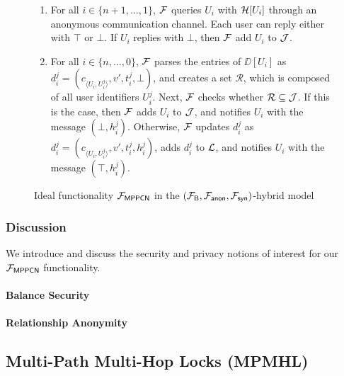 \begin{figure*}[!t]
{{\begin{enumerate}
	\item For all $i \in \{n+1,\ldots,1\}$, $\mathcal{F}$ queries $U_i$ with $\mathcal{H}[U_i]$ through an 
	anonymous communication channel. Each user can reply either with $\top$ or $\bot$. If 
	$U_i$ replies with $\bot$, then $\mathcal{F}$ add $U_i$ to $\mathcal{J}$.
	
	\item For all $i \in \{n,\ldots,0\}$, $\mathcal{F}$ parses the entries of $\DD[U_i]$ as 
	$d_i^j = (c_{\langle U_i,U_i^j \rangle}, v', t_i^j, \bot)$, and creates a set 
	$\mathcal{R}$, which is composed of all user identifiers $U_i^j$. Next, $\mathcal{F}$ checks 
	whether $\mathcal{R} \subseteq \mathcal{J}$. If this is the case, then $\mathcal{F}$ adds $U_i$ to $\mathcal{J}$, 
	and notifies $U_i$ with the message $(\bot, h_i^j)$. Otherwise, $\mathcal{F}$ updates $d_i^j$ as 
	$d_i^j = (c_{\langle U_i,U_i^j \rangle}, v', t_i^j, h_i^j)$, adds $d_i^j$ to $\mathcal{L}$, and 
	notifies $U_i$ with the message $(\top, h_i^j)$.
\end{enumerate}
}}

\caption{Ideal functionality $\mathcal{F}_{\mathsf{MPPCN}}$ in the 
$(\mathcal{F}_{\mathsf{B}}, \mathcal{F}_{\mathsf{anon}}, \mathcal{F}_{\mathsf{syn}})$-hybrid model}
\label{fig:ideal-mppcn}
\end{figure*}

\subsubsection{Discussion}
\label{sec:mppcn-discussion}

We introduce and discuss the security and privacy notions of interest for our 
$\mathcal{F}_{\mathsf{MPPCN}}$ functionality.


\paragraph{Balance Security}

\paragraph{Relationship Anonymity}

\subsection{Multi-Path Multi-Hop Locks (MPMHL)}
\label{sec:mpmhl}

